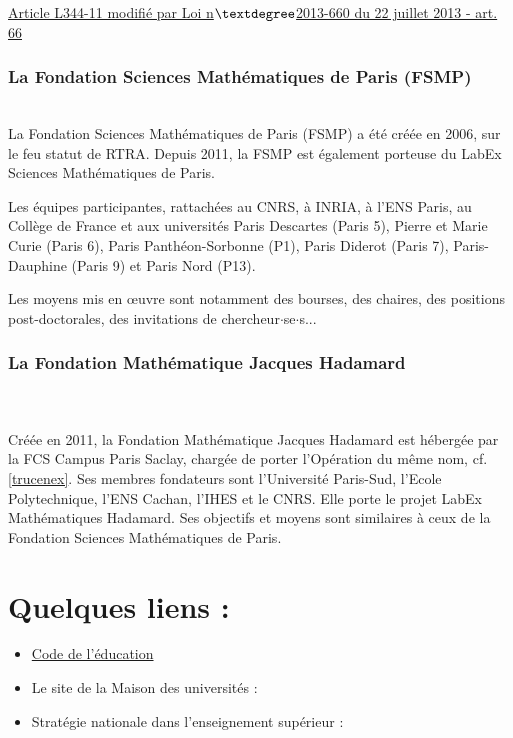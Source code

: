 \href{https://www.legifrance.gouv.fr/affichCode.do?idSectionTA=LEGISCTA000027748290&cidTexte=LEGITEXT000006071190}{Article L344-11 modifi\'e par Loi n$\textdegree$2013-660 du 22 juillet 2013 - art. 66}

\subsubsection{La Fondation Sciences Math\'ematiques de Paris (FSMP)}
 \\

La Fondation Sciences Math\'ematiques de Paris (FSMP) a \'et\'e cr\'e\'ee en 2006, sur le feu statut de RTRA. 
Depuis 2011, la FSMP est \'egalement porteuse du LabEx Sciences Math\'ematiques de Paris. 

Les \'equipes participantes, rattach\'ees au CNRS, \`a INRIA, \`a l'ENS Paris,
au Coll\`ege de France et aux universit\'es Paris Descartes (Paris 5), Pierre et Marie Curie (Paris 6), Paris Panth\'eon-Sorbonne (P1), Paris Diderot (Paris 7), Paris-Dauphine (Paris 9) et Paris Nord (P13).

Les moyens mis en \oe uvre sont notamment des bourses, des chaires, des positions post-doctorales, des invitations de chercheur$\cdot$se$\cdot$s...

\subsubsection{La Fondation Math\'ematique Jacques Hadamard}
 \\ \\
Cr\'e\'ee en 2011, la Fondation Math\'ematique Jacques Hadamard est h\'eberg\'ee par la FCS Campus Paris Saclay, charg\'ee de porter l'Op\'eration du m\^eme nom, cf. \ref{trucenex}.
Ses membres fondateurs sont l'Universit\'e Paris-Sud, l'Ecole Polytechnique, l'ENS Cachan, l'IHES et le CNRS. Elle porte le projet LabEx Math\'ematiques Hadamard. Ses objectifs
et moyens sont similaires \`a ceux de la Fondation Sciences Math\'ematiques de Paris.

\quad

\section*{Quelques liens :}
\begin{itemize}
\item \href{https://www.legifrance.gouv.fr/affichCode.do;jsessionid=C8BFF801F2976E9272297AB33338C553.tpdila14v_3?cidTexte=LEGITEXT000006071191&dateTexte=20170113}{Code de l'\'education} 
\item Le site de la Maison des universit\'es : 
\item Strat\'egie nationale dans l'enseignement sup\'erieur : \\
\end{itemize}
